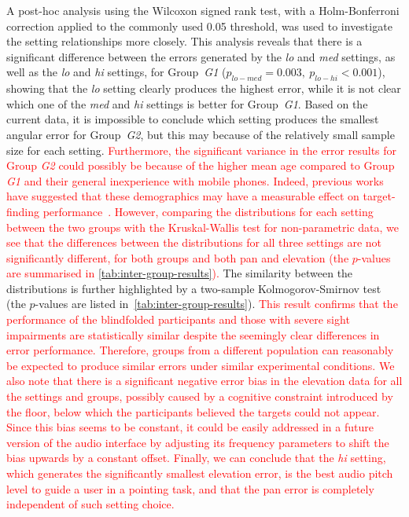 \documentclass[acmsmall]{acmart}
\newcommand\hl[1]{\textcolor{red}{#1}}
\begin{document}
A post-hoc analysis using the Wilcoxon signed rank test, with a Holm-Bonferroni correction applied to the commonly used 0.05 threshold, was used to investigate the setting relationships more closely. 
This analysis reveals that there is a significant difference between the errors generated by the \textit{lo} and \textit{med} settings, as well as the \textit{lo} and \textit{hi} settings, for Group~\textit{G1} ($p_{lo-med} = 0.003,~p_{lo-hi} < 0.001$), showing that the \textit{lo} setting clearly produces the highest error, while it is not clear which one of the \textit{med} and \textit{hi} settings is better for Group~\textit{G1}. 
Based on the current data, it is impossible to conclude which setting produces the smallest angular error for Group~\textit{G2}, but this may because of the relatively small sample size for each setting. 
\hl{Furthermore, the significant variance in the error results for Group \textit{G2} could possibly be because of the higher mean age compared to Group \textit{G1} and their general inexperience with mobile phones.
Indeed, previous works have suggested that these demographics may have a measurable effect on target-finding performance~\citep{millar1994understanding,pring2008psychological}.
However, comparing the distributions for each setting between the two groups with the Kruskal-Wallis test for non-parametric data, we see that the differences between the distributions for all three settings are not significantly different, for both groups and both pan and elevation (the $p$-values are summarised in \cref{tab:inter-group-results}).}
The similarity between the distributions is further highlighted by a two-sample Kolmogorov-Smirnov test (the $p$-values are listed in~\cref{tab:inter-group-results}).
\hl{This result confirms that the performance of the blindfolded participants and those with severe sight impairments are statistically similar despite the seemingly clear differences in error performance.
Therefore, groups from a different population can reasonably be expected to produce similar errors under similar experimental conditions. 
We also note that there is a significant negative error bias in the elevation data for all the settings and groups, possibly caused by a cognitive constraint introduced by the floor, below which the participants believed the targets could not appear.
Since this bias seems to be constant, it could be easily addressed in a future version of the audio interface by adjusting its frequency parameters to shift the bias upwards by a constant offset. 
Finally, we can conclude that the \textit{hi} setting, which generates the significantly smallest elevation error, is the best audio pitch level to guide a user in a pointing task, and that the pan error is completely independent of such setting choice. }
\end{document}
